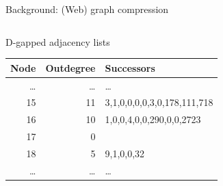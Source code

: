 \documentclass[aspectratio=169,xcolor=table]{beamer}
\begin{document}
\begin{frame}{Background: (Web) graph compression}
\begin{columns}
\begin{column}{0.50\columnwidth}
\begin{block}{D-gapped adjacency lists}
                    \begin{center}
                        \begin{tabular}{rrl}
                            \alert{Node} & \alert{Outdegree} & \alert{Successors}\\
                            \hline
                            \ldots{} & \ldots{} & \ldots{}\\
                            15 & 11 & 3,1,0,0,0,0,3,0,178,111,718\\
                            16 & 10 & 1,0,0,4,0,0,290,0,0,2723\\
                            17 & 0 & \\
                            18 & 5 & 9,1,0,0,32\\
                            \ldots{} & \ldots{} & \ldots{}\\
                        \end{tabular}
                    \end{center}
                \end{block}
            \end{column}
        \end{columns}
    \end{frame}
\end{document}
